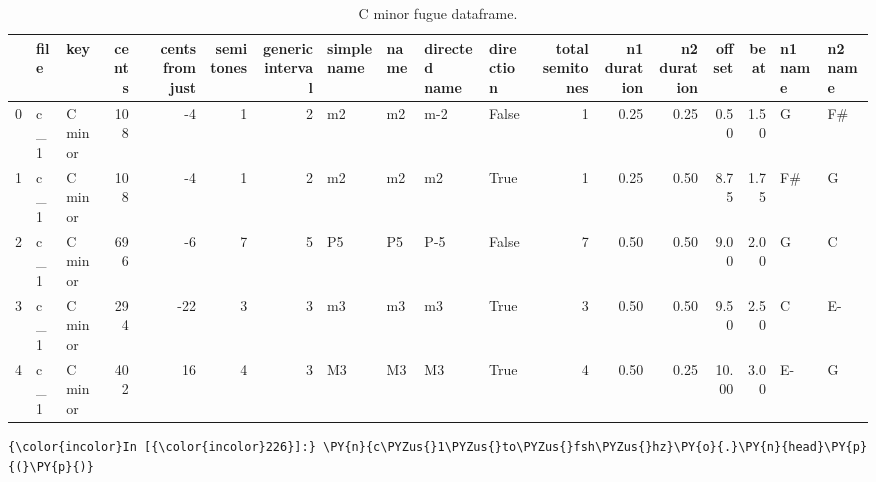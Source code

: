 \begin{singlespace}
\begin{table}[H]
\centering
\tiny
\begin{tabular}{|lllrrrrllllrrrrrll|}
\hline
\textbf{{}} & \textbf{file} & \textbf{     key} & \textbf{ cents} & \textbf{ cents from just} & \textbf{ semitones} & \textbf{ generic interval} & \textbf{simple name} & \textbf{name} & \textbf{directed name} & \textbf{direction} & \textbf{ total semitones} & \textbf{ n1 duration} & \textbf{ n2 duration} & \textbf{ offset} & \textbf{ beat} & \textbf{n1 name} & \textbf{n2 name }\\
\hline
0 &  c\_1 &  C minor &    108 &               -4 &          1 &                 2 &          m2 &   m2 &           m-2 &     False &                1 &         0.25 &         0.25 &    0.50 &  1.50 &       G &      F\# \\
1 &  c\_1 &  C minor &    108 &               -4 &          1 &                 2 &          m2 &   m2 &            m2 &      True &                1 &         0.25 &         0.50 &    8.75 &  1.75 &      F\# &       G \\
2 &  c\_1 &  C minor &    696 &               -6 &          7 &                 5 &          P5 &   P5 &           P-5 &     False &                7 &         0.50 &         0.50 &    9.00 &  2.00 &       G &       C \\
3 &  c\_1 &  C minor &    294 &              -22 &          3 &                 3 &          m3 &   m3 &            m3 &      True &                3 &         0.50 &         0.50 &    9.50 &  2.50 &       C &      E- \\
4 &  c\_1 &  C minor &    402 &               16 &          4 &                 3 &          M3 &   M3 &            M3 &      True &                4 &         0.50 &         0.25 &   10.00 &  3.00 &      E- &       G \\
\hline
\end{tabular}
\caption{C minor fugue dataframe. }
\end{table}
\normalsize
\end{singlespace}
    \begin{Verbatim}[commandchars=\\\{\}]
{\color{incolor}In [{\color{incolor}226}]:} \PY{n}{c\PYZus{}1\PYZus{}to\PYZus{}fsh\PYZus{}hz}\PY{o}{.}\PY{n}{head}\PY{p}{(}\PY{p}{)}
\end{Verbatim}
